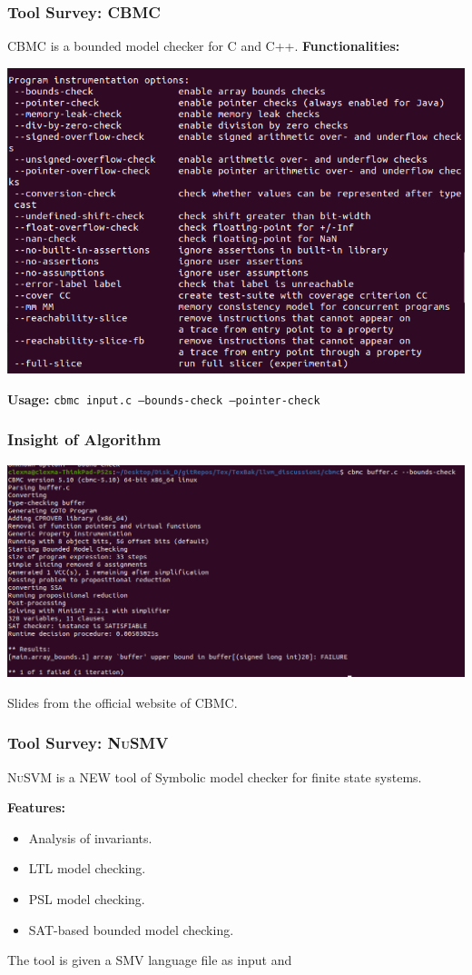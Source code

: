 \documentclass[11pt]{beamer}
\begin{document}
\begin{frame}\frametitle{Tool Survey: \textsc{CBMC}}
\textsc{CBMC} is a bounded model checker for C and C++.
\textbf{Functionalities:}
\begin{center}
\includegraphics[scale=0.38]{funcCbmc.png}
\end{center}
\textbf{Usage:}
\texttt{cbmc input.c --bounds-check --pointer-check}
\end{frame}
\begin{frame}\frametitle{Insight of Algorithm}
\begin{center}
\includegraphics[scale=0.35]{expCbmc.png}
\end{center}
Slides from the official website of \textsc{CBMC}.
\end{frame}


\begin{frame}\frametitle{Tool Survey: \textsc{NuSMV}}
\textsc{NuSVM} is a NEW tool of Symbolic model checker for finite state systems.

\textbf{Features:}
\begin{itemize}
\item Analysis of invariants.
\item LTL model checking.
\item PSL model checking.
\item SAT-based bounded model checking.
\end{itemize}
The tool is given a SMV language file as input and 
\end{frame}
\end{document}
